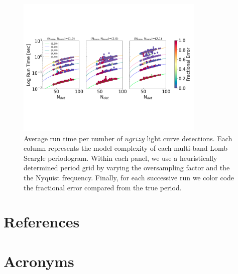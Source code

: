 \documentclass[DM,authoryear,toc]{lsstdoc}
\begin{document}








\begin{figure}
  \includegraphics[width=0.8\textwidth]{figures/run_time_analysis.pdf}
  \centering 
  \caption{Average run time per number of $ugrizy$ light curve detections. Each column represents the model complexity of each multi-band Lomb Scargle periodogram. Within each panel, we use a heuristically determined period grid by varying the oversampling factor and the the Nyquist frequency.  Finally, for each successive run we color code the fractional error compared from the true period.}
\end{figure}


\appendix
\section{References} \label{sec:bib}


\section{Acronyms} \label{sec:acronyms}

\end{document}
